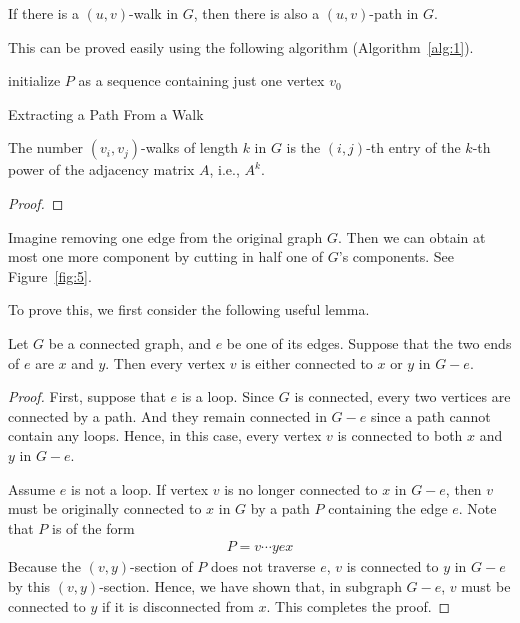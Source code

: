 \documentclass[thmcnt=section, 12pt, color=cyan]{my-elegantbook}
\begin{document}
\begin{proposition} \label{pro:7}
    If there is a $(u, v)$-walk in $G$, then there is also a $(u, v)$-path in $G$.
\end{proposition}

This can be proved easily using the following algorithm (Algorithm~\ref{alg:1}).

\begin{algorithm}[ht]
    initialize $P$ as a sequence containing just one vertex $v_0$ \;
    \caption{Extracting a Path From a Walk}
    \label{alg:1}
\end{algorithm}


\begin{proposition}
    The number $(v_i, v_j)$-walks of length $k$ in $G$ is the $(i,j)$-th entry of the $k$-th power of the adjacency matrix $A$, i.e., $A^k$.
\end{proposition}

\begin{proof}
\end{proof}


Imagine removing one edge from the original graph $G$.
Then we can obtain at most one more component 
by cutting in half one of $G$'s components.
See Figure~\ref{fig:5}.

To prove this, we first consider
the following useful lemma.

\begin{lemma} \label{lem:1}
	Let $G$ be a connected graph, 
	and $e$ be one of its edges.
	Suppose that the two ends of $e$ are $x$ and $y$.
	Then every vertex $v$ is either connected to $x$
	or $y$ in $G-e$.
\end{lemma}

\begin{proof}
	First, suppose that $e$ is a loop.
	Since $G$ is connected, 
	every two vertices are connected by a path.
	And they remain connected in $G-e$ 
	since a path cannot contain any loops.
	Hence, in this case, every vertex $v$ 
	is connected to both $x$ and $y$ in $G-e$.

	Assume $e$ is not a loop. 
	If vertex $v$ is no longer connected to $x$ in $G-e$,
	then $v$ must be originally connected to $x$
	in $G$
	by a path $P$ containing the edge $e$.
	Note that $P$ is of the form 
	\begin{align*}
		P = v \cdots y e x
	\end{align*}
	Because the $(v,y)$-section of $P$ does not traverse $e$,
	$v$ is connected to $y$ in $G-e$ by this $(v,y)$-section.
	Hence, we have shown that, 
	in subgraph $G-e$, 
	$v$ must be connected to $y$ 
	if it is disconnected from $x$.
	This completes the proof.
\end{proof}
\end{document}
